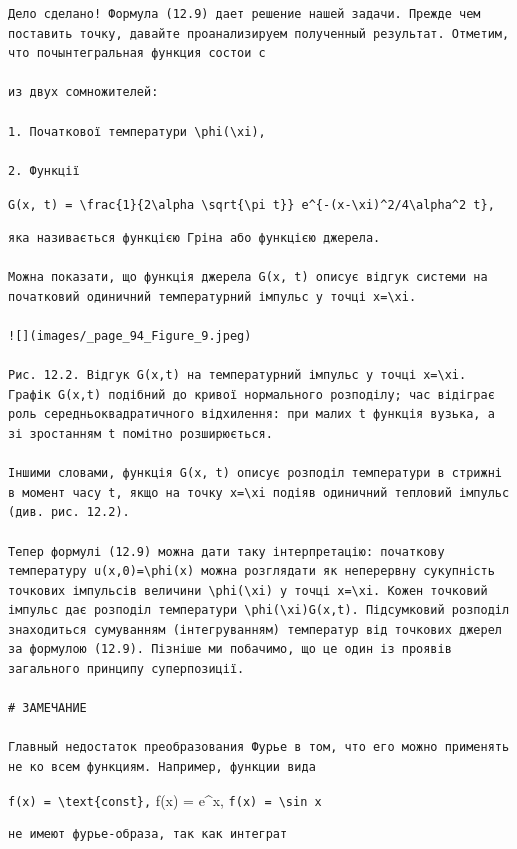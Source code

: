 \documentclass[
  ukrainian,
]{article}
\begin{document}
\begin{verbatim}
Дело сделано! Формула (12.9) дает решение нашей задачи. Прежде чем поставить точку, давайте проанализируем полученный результат. Отметим, что почынтегральная функция состои с

из двух сомножителей:

1. Початкової температури \phi(\xi),

2. Функції
\end{verbatim}

\texttt{G(x,\ t)\ =\ \textbackslash{}frac\{1\}\{2\textbackslash{}alpha\ \textbackslash{}sqrt\{\textbackslash{}pi\ t\}\}\ e\^{}\{-(x-\textbackslash{}xi)\^{}2/4\textbackslash{}alpha\^{}2\ t\},}

\begin{verbatim}
яка називається функцією Гріна або функцією джерела.

Можна показати, що функція джерела G(x, t) описує відгук системи на початковий одиничний температурний імпульс у точці x=\xi.

![](images/_page_94_Figure_9.jpeg)

Рис. 12.2. Відгук G(x,t) на температурний імпульс у точці x=\xi. Графік G(x,t) подібний до кривої нормального розподілу; час відіграє роль середньоквадратичного відхилення: при малих t функція вузька, а зі зростанням t помітно розширюється.

Іншими словами, функція G(x, t) описує розподіл температури в стрижні в момент часу t, якщо на точку x=\xi подіяв одиничний тепловий імпульс (див. рис. 12.2).

Тепер формулі (12.9) можна дати таку інтерпретацію: початкову температуру u(x,0)=\phi(x) можна розглядати як неперервну сукупність точкових імпульсів величини \phi(\xi) у точці x=\xi. Кожен точковий імпульс дає розподіл температури \phi(\xi)G(x,t). Підсумковий розподіл знаходиться сумуванням (інтегруванням) температур від точкових джерел за формулою (12.9). Пізніше ми побачимо, що це один із проявів загального принципу суперпозиції.

# ЗАМЕЧАНИЕ

Главный недостаток преобразования Фурье в том, что его можно применять не ко всем функциям. Например, функции вида
\end{verbatim}

\texttt{f(x)\ =\ \textbackslash{}text\{const\},} f(x) = e\^{}x,
\texttt{f(x)\ =\ \textbackslash{}sin\ x}

\begin{verbatim}
не имеют фурье-образа, так как интеграт
\end{verbatim}
\end{document}

